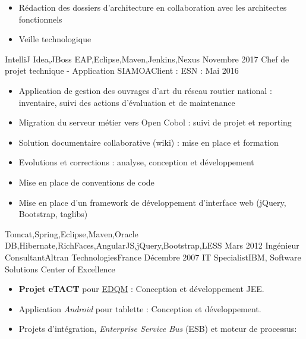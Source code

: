 \begin{experiences}
{\begin{itemize}
                        \item Rédaction des dossiers d'architecture en collaboration avec les architectes fonctionnels
                        \item Veille technologique
                      \end{itemize}
                    }
                    {IntelliJ Idea,JBoss EAP,Eclipse,Maven,Jenkins,Nexus}
  \emptySeparator
  \experience
    {Novembre 2017}     {Chef de projet technique - Application SIAMOA}{Client : }{ESN : }
    {Mai 2016}    {
                      \begin{itemize}
                        \item Application de gestion des ouvrages d'art du réseau routier national : inventaire, suivi des actions d'évaluation et de maintenance
                        \item Migration du serveur métier vers Open Cobol : suivi de projet et reporting
                        \item Solution documentaire collaborative (wiki) : mise en place et formation
                        \item Evolutions et corrections : analyse, conception et développement
                        \item Mise en place de conventions de code
                        \item Mise en place d'un framework de développement d'interface web (jQuery, Bootstrap, taglibs)
                      \end{itemize}
                    }
                    {Tomcat,Spring,Eclipse,Maven,Oracle DB,Hibernate,RichFaces,AngularJS,jQuery,Bootstrap,LESS}
  \emptySeparator
  \consultantexperience
  {Mars 2012}       {Ingénieur Consultant}{Altran Technologies}{France}
  {Décembre 2007}   {IT Specialist}{IBM, Software Solutions Center of Excellence}
                    {
                      \begin{itemize}
                        \item \textbf{Projet eTACT} pour \href{https://www.edqm.eu/fr/contexte-mission-cd-p-phcmed.html}{EDQM} : Conception et développement JEE.
                        \item Application \emph{Android} pour tablette : Conception et développement.
                        \item Projets d'intégration, \emph{Enterprise Service Bus} (ESB) et moteur de processus:

\end{itemize}}
\end{experiences}
